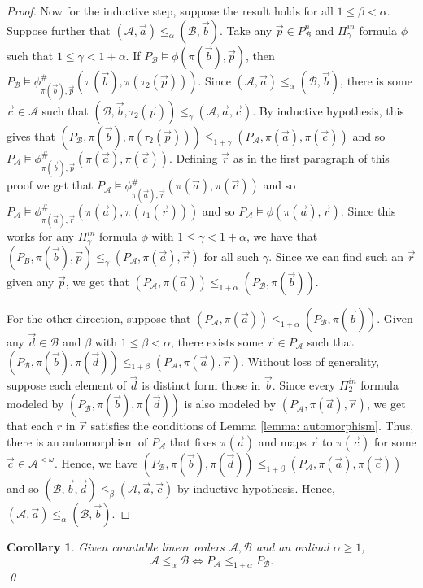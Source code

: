 \documentclass{amsart}%
\numberwithin{theorem}{section}
\newtheorem{corollary}[theorem]{Corollary}
\newcommand{\A}{\mathcal{A}}
\newcommand{\B}{\mathcal{B}}
\newcommand{\0}{\emptyset}
\newcommand{\lom}{^{< \omega}}
\begin{document}
\begin{proof}
   Now for the inductive step, suppose the result holds for all $1\leq \beta <\alpha$. Suppose further that $(\A,\vec a)\leq_\alpha (\B,\vec b)$. Take any $\vec p\in P_\B^n$ and $\Pi^{in}_\gamma$ formula $\phi$ such that $1\leq \gamma<1+\alpha$. If $P_\B\models \phi(\pi(\vec b),\vec p)$, then $P_\B\models \phi^\#_{\pi(\vec b),\vec p}\left(\pi(\vec b),\pi(\tau_2(\vec p))\right)$. Since $(\A,\vec a)\leq_\alpha (\B,\vec b)$, there is some $\vec c\in \A$ such that $(\B,\vec b, \tau_2(\vec p))\leq_\gamma (\A,\vec a,\vec c)$. By inductive hypothesis, this gives that $(P_\B,\pi(\vec b), \pi(\tau_2(\vec p)))\leq_{1+\gamma}(P_\A,\pi(\vec a),\pi(\vec c))$ and so $P_\A\models \phi^\#_{\pi(\vec b),\vec p}(\pi(\vec a),\pi( \vec c))$. Defining $\vec r$ as in the first paragraph of this proof we get that $P_\A\models \phi^\#_{\pi(\vec a),\vec r}(\pi(\vec a),\pi(\vec c))$ and so $P_\A\models \phi^\#_{\pi(\vec a),\vec r}(\pi(\vec a),\pi(\tau_1(\vec r)))$ and so $P_\A \models \phi(\pi(\vec a),\vec r)$. Since this works for any $\Pi_\gamma^{in}$ formula $\phi$ with $1\leq\gamma<1+\alpha$, we have that $(P_B,\pi(\vec b),\vec p)\leq_\gamma (P_\A,\pi(\vec a),\vec r)$ for all such $\gamma$. Since we can find such an $\vec r$ given any $\vec p$, we get that $(P_\A,\pi(\vec a))\leq_{1+\alpha}(P_\B,\pi(\vec b))$. 

   For the other direction, suppose that $(P_\A, \pi(\vec a))\leq_{1+\alpha} (P_\B, \pi(\vec b))$. Given any $\vec d\in \B$ and $\beta$ with $1\leq \beta<\alpha$, there exists some $\vec r\in P_\A$ such that $(P_\B,\pi(\vec b),\pi(\vec d))\leq_{1+\beta} (P_\A, \pi(\vec a),\vec r)$. Without loss of generality, suppose each element of $\vec d$ is distinct form those in $\vec b$. Since every $\Pi^{in}_2$ formula modeled by $(P_\B,\pi(\vec b),\pi (\vec d))$ is also modeled by $(P_\A,\pi(\vec a),\vec r)$, we get that each $r$ in $\vec r$ satisfies the conditions of Lemma \ref{lemma: automorphism}.  Thus, there is an automorphism of $P_\A$ that fixes $\pi(\vec a)$ and maps $\vec r$ to $\pi(\vec c)$ for some $\vec c\in \A\lom$. Hence, we have $(P_\B,\pi(\vec b),\pi(\vec d))\leq_{1+\beta} (P_\A, \pi(\vec a),\pi(\vec c))$ and so $(\B,\vec b,\vec d)\leq_\beta (\A,\vec a,\vec c)$ by inductive hypothesis. Hence, $(\A,\vec a)\leq_\alpha (\B,\vec b) $.  \end{proof}

   \begin{corollary}
   \label{Ls iff 1+ Ps}
       Given countable linear orders $\A,\B$ and an ordinal $\alpha\geq 1$, $$\A\leq_\alpha \B \iff P_\A \leq_{1+\alpha} P_\B. $$\qed
   \end{corollary}
\end{document}
